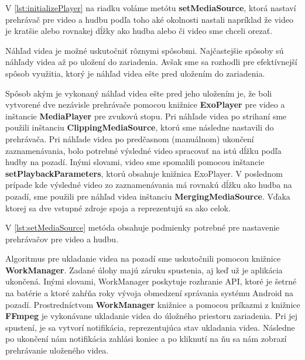 \documentclass[12pt, oneside]{book}
\begin{document}
V \autoref{lst:initializePlayer} na riadku voláme metótu \textbf{setMediaSource}, ktorá nastaví prehrávač pre video a hudbu podľa toho aké okolnosti nastali napríklad že video je kratšie alebo rovnakej dĺžky ako hudba alebo či video sme chceli orezať.

\hspace{15pt} Náhľad videa je možné uskutočniť rôznymi spôsobmi. Najčastejšie spôsoby sú náhľady videa až po uložení do zariadenia. Avšak sme sa rozhodli pre efektívnejší spôsob využitia, ktorý je náhľad videa ešte pred uložením do zariadenia. 

Spôsob akým je vykonaný náhľad videa ešte pred jeho uložením je, že boli vytvorené dve nezávisle prehrávače pomocou knižnice \textbf{ExoPlayer} pre video a inštancie \textbf{MediaPlayer} pre zvukovú stopu. Pri náhľade videa po strihaní sme použili inštanciu \textbf{ClippingMediaSource}, ktorú sme následne nastavili do prehrávača. Pri náhľade videa po predčasnom (manuálnom) ukončení zaznamenávania, bolo potrebné výsledné video spracovať na istú dĺžku podľa hudby na pozadí. Inými slovami, video sme spomalili pomocou inštancie \textbf{setPlaybackParameters}, ktorú obsahuje knižnica ExoPlayer. V poslednom prípade kde výsledné video zo zaznamenávania má rovnakú dĺžku ako hudba na pozadí, sme použili pre náhľad videa inštanciu \textbf{MergingMediaSource}. Vďaka ktorej sa dve vstupné zdroje spoja a reprezentujú sa ako celok.




V \autoref{lst:setMediaSource} metóda obsahuje podmienky potrebné pre nastavenie prehrávačov pre video a hudbu.


Algoritmus pre ukladanie videa na pozadí sme uskutočnili pomocou knižnice \textbf{WorkManager}. Zadané úlohy majú záruku spustenia, aj keď už je aplikácia ukončená. Inými slovami, WorkManager poskytuje rozhranie API, ktoré je šetrné na batérie a ktoré zahŕňa roky vývoja obmedzení správania systému Android na pozadí. Prostredníctvom \textbf{WorkManager} knižnice a pomocou príkazmi z knižnice \textbf{FFmpeg} je vykonávane ukladanie videa do úložného priestoru zariadenia. Pri jej spustení, je sa vytvorí notifikácia, reprezentujúca stav ukladania videa. Následne po ukončení nám notifikácia zahlási koniec a po kliknutí na ňu sa nám zobrazí prehrávanie uloženého videa.
\end{document}
